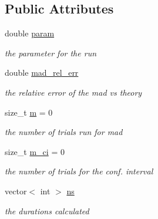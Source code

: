 \subsection*{Public Attributes}
\begin{DoxyCompactItemize}
\item 
\mbox{\label{structKappaResult_ac8485e1a2316db98a89d0aecc39e3389}} 
double \mbox{\hyperlink{structKappaResult_ac8485e1a2316db98a89d0aecc39e3389}{param}}
\begin{DoxyCompactList}\small\item\em the parameter for the run \end{DoxyCompactList}\item 
double \mbox{\hyperlink{structKappaResult_a9fb1e6cd969e50ab18dae7fbf598f949}{mad\+\_\+rel\+\_\+err}}
\begin{DoxyCompactList}\small\item\em the relative error of the mad vs theory \end{DoxyCompactList}\item 
\mbox{\label{structKappaResult_a5d2264180cefdfefd364065aaf405b72}} 
size\+\_\+t \mbox{\hyperlink{structKappaResult_a5d2264180cefdfefd364065aaf405b72}{m}} = 0
\begin{DoxyCompactList}\small\item\em the number of trials run for mad \end{DoxyCompactList}\item 
\mbox{\label{structKappaResult_a59f858c0abe9db0eebd82a56665b38df}} 
size\+\_\+t \mbox{\hyperlink{structKappaResult_a59f858c0abe9db0eebd82a56665b38df}{m\+\_\+ci}} = 0
\begin{DoxyCompactList}\small\item\em the number of trials for the conf. interval \end{DoxyCompactList}\item 
vector$<$ int $>$ \mbox{\hyperlink{structKappaResult_a48d379e6c356ee537839917a67a21c86}{ns}}
\begin{DoxyCompactList}\small\item\em the durations calculated \end{DoxyCompactList}\item 
\mbox{\label{structKappaResult_a133a1322d9761ce51027209c1b344693}} 

\end{DoxyCompactItemize}
